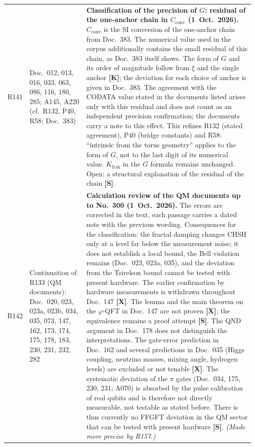 \begin{longtable}{@{}p{0.9cm}p{3.1cm}p{10.2cm}@{}}
R141 & Doc.~012, 013, 016, 033, 063, 086, 116, 180, 285; A145, A220 (cf.\ R132, P40, R58; Doc.~383) & \textbf{Classification of the precision of $G$: residual of the one-anchor chain in $C_{\mathrm{conv}}$ (1~Oct.~2026).} $C_{\mathrm{conv}}$ is the SI conversion of the one-anchor chain from Doc.~383. The numerical value used in the corpus additionally contains the small residual of this chain, as Doc.~383 itself shows. The form of $G$ and its order of magnitude follow from $\xi$ and the single anchor \textbf{[K]}; the deviation for each choice of anchor is given in Doc.~383. The agreement with the CODATA value stated in the documents listed arises only with this residual and does not count as an independent precision confirmation; the documents carry a note to this effect. This refines R132 (stated agreement), P40 (bridge constants) and R58: ``intrinsic from the torus geometry'' applies to the form of $G$, not to the last digit of its numerical value. $K_{\mathrm{frak}}$ in the $G$ formula remains unchanged. Open: a structural explanation of the residual of the chain \textbf{[S]}. \\
R142 & Continuation of R133 (QM documents): Doc.~020, 023, 023a, 023b, 034, 035, 073, 147, 162, 173, 174, 175, 178, 183, 230, 231, 232, 282 & \textbf{Calculation review of the QM documents up to No.~300 (1~Oct.~2026).} The errors are corrected in the text, each passage carries a dated note with the previous wording. Consequences for the classification: the fractal damping changes CHSH only at a level far below the measurement noise; it does not establish a local bound, the Bell violation remains (Doc.~023, 023a, 035), and the deviation from the Tsirelson bound cannot be tested with present hardware. The earlier confirmation by hardware measurements is withdrawn throughout Doc.~147 \textbf{[X]}. The lemma and the main theorem on the $\varphi$-QFT in Doc.~147 are not proven \textbf{[X]}; the equivalence remains a proof attempt \textbf{[S]}. The QND argument in Doc.~178 does not distinguish the interpretations. The gate-error prediction in Doc.~162 and several predictions in Doc.~035 (Higgs coupling, neutrino masses, mixing angle, hydrogen levels) are excluded or not tenable \textbf{[X]}. The systematic deviation of the $\pi$ gates (Doc.~034, 175, 230, 231; A070) is absorbed by the pulse calibration of real qubits and is therefore not directly measurable, not testable as stated before. There is thus currently no FFGFT deviation in the QM sector that can be tested with present hardware \textbf{[S]}. \emph{(Made more precise by R157.)} \\

\end{longtable}
